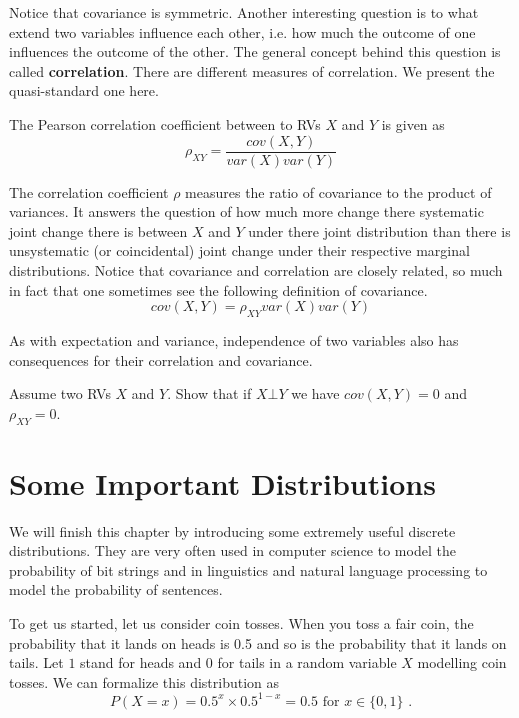 Notice that covariance is symmetric. Another interesting question is to what extend two variables influence each other, i.e. how much the outcome of one
influences the outcome of the other. The general concept behind this question is called \textbf{correlation}. There are different measures of correlation.
We present the quasi-standard one here.
\begin{Definition}
The Pearson correlation coefficient between to RVs $ X $ and $ Y $ is given as
$$ \rho_{XY} = \frac{cov(X,Y)}{var(X)var(Y)} $$
\end{Definition}

The correlation coefficient $ \rho $ measures the ratio of covariance to the product of variances. It answers the question of how much more change there systematic
joint change there is between $ X $ and $ Y $ under there joint distribution than there is unsystematic (or coincidental) joint change under their respective
marginal distributions. Notice that covariance and correlation are closely related, so much in fact that one sometimes see the following definition of covariance.
\begin{equation}
cov(X,Y) =  \rho_{XY}var(X)var(Y)
\end{equation}

As with expectation and variance, independence of two variables also has consequences for their correlation and covariance.
\begin{Exercise}
Assume two RVs $ X $ and $ Y $. Show that if $ X \bot Y $ we have $ cov(X,Y) = 0 $ and $ \rho_{XY} = 0 $.
\end{Exercise}

\section{Some Important Distributions} \label{sec:importantdistributions}

We will finish this chapter by introducing some extremely useful discrete distributions. They are very often used in
computer science to model the probability of bit strings and in linguistics and natural language processing to model
the probability of sentences. 

To get us started, let us consider coin tosses. When you toss a fair coin, the probability that it lands on heads is 0.5 and
so is the probability that it lands on tails. Let $ 1 $ stand for heads and $ 0 $ for tails in a random variable $ X $ 
modelling coin tosses. We can formalize this distribution as
\begin{equation*}
P(X=x) = 0.5^{x}\times 0.5^{1-x} = 0.5 \mbox{ for $x \in \{0,1\}$ .}
\end{equation*}

